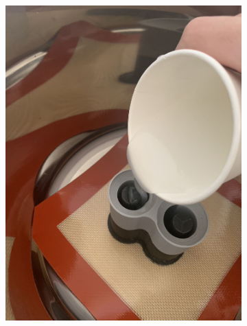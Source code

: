 \documentclass[twoside, 11pt]{article}
\begin{document}
\begin{figure}[H]
\begin{subfigure}[t]{0.165\linewidth}
		\includegraphics[width=\textwidth]{pour}
	\end{subfigure}%
	\begin{subfigure}[t]{0.165\linewidth}
		\centering		

\end{subfigure}
\end{figure}
\end{document}
